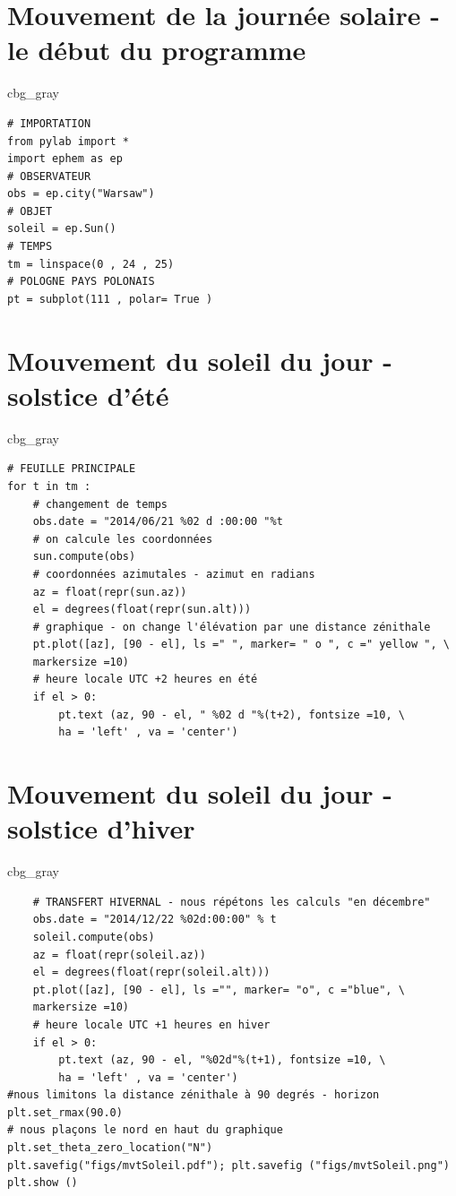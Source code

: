 \documentclass[%
oneside,                 %
final,                   %
10pt,french]{article}
\newenvironment{_cod_tight}[1]{
   \def\FrameCommand{\colorbox{#1}}
   \FrameRule0.6pt\MakeFramed {\FrameRestore}\vskip3mm}
   {\vskip0mm\endMakeFramed}
\newenvironment{cod}[1]{
\bgroup\rmfamily
\fboxsep=0mm\relax
\begin{_cod_tight}{#1}
\list{}{\parsep=-2mm\parskip=0mm\topsep=0pt\leftmargin=2mm
\rightmargin=2\leftmargin\leftmargin=4pt\relax}
\item\relax}
{\endlist\end{_cod_tight}\egroup}
\begin{document}
\section{Mouvement de la journée solaire - le début du programme}
\begin{cod}{cbg_gray}\begin{verbatim}
# IMPORTATION
from pylab import *
import ephem as ep
# OBSERVATEUR
obs = ep.city("Warsaw")
# OBJET
soleil = ep.Sun()
# TEMPS
tm = linspace(0 , 24 , 25)
# POLOGNE PAYS POLONAIS
pt = subplot(111 , polar= True )
\end{verbatim}
\end{cod}
\noindent
\section{Mouvement du soleil du jour - solstice d'été}
\begin{cod}{cbg_gray}\begin{verbatim}
# FEUILLE PRINCIPALE
for t in tm :
    # changement de temps
    obs.date = "2014/06/21 %02 d :00:00 "%t
    # on calcule les coordonnées
    sun.compute(obs)
    # coordonnées azimutales - azimut en radians
    az = float(repr(sun.az))
    el = degrees(float(repr(sun.alt)))
    # graphique - on change l'élévation par une distance zénithale
    pt.plot([az], [90 - el], ls =" ", marker= " o ", c =" yellow ", \
    markersize =10)
    # heure locale UTC +2 heures en été
    if el > 0:
        pt.text (az, 90 - el, " %02 d "%(t+2), fontsize =10, \
        ha = 'left' , va = 'center')
\end{verbatim}
\end{cod}
\noindent
\section{Mouvement du soleil du jour - solstice d'hiver}
\begin{cod}{cbg_gray}\begin{verbatim}
    # TRANSFERT HIVERNAL - nous répétons les calculs "en décembre"
    obs.date = "2014/12/22 %02d:00:00" % t
    soleil.compute(obs)
    az = float(repr(soleil.az))
    el = degrees(float(repr(soleil.alt)))
    pt.plot([az], [90 - el], ls ="", marker= "o", c ="blue", \
    markersize =10)
    # heure locale UTC +1 heures en hiver
    if el > 0:
        pt.text (az, 90 - el, "%02d"%(t+1), fontsize =10, \
        ha = 'left' , va = 'center')
#nous limitons la distance zénithale à 90 degrés - horizon
plt.set_rmax(90.0)
# nous plaçons le nord en haut du graphique
plt.set_theta_zero_location("N")
plt.savefig("figs/mvtSoleil.pdf"); plt.savefig ("figs/mvtSoleil.png")
plt.show ()
\end{verbatim}
\end{cod}
\noindent
\end{document}
